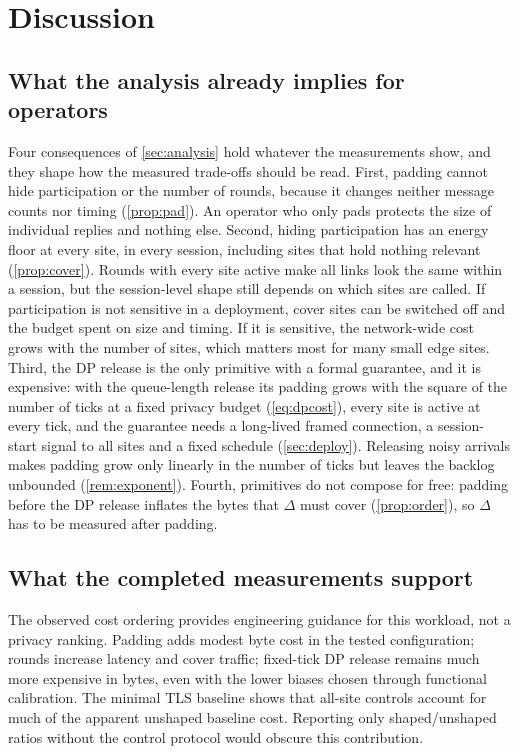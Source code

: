 \section{Discussion}\label{sec:discussion}

\subsection{What the analysis already implies for operators}
Four consequences of \cref{sec:analysis} hold whatever the measurements show, and they shape how the measured trade-offs should be read.
First, padding cannot hide participation or the number of rounds, because it changes neither message counts nor timing (\cref{prop:pad}). An operator who only pads protects the size of individual replies and nothing else.
Second, hiding participation has an energy floor at every site, in every session, including sites that hold nothing relevant (\cref{prop:cover}). Rounds with every site active make all links look the same within a session, but the session-level shape still depends on which sites are called. If participation is not sensitive in a deployment, cover sites can be switched off and the budget spent on size and timing. If it is sensitive, the network-wide cost grows with the number of sites, which matters most for many small edge sites.
Third, the DP release is the only primitive with a formal guarantee, and it is expensive: with the queue-length release its padding grows with the square of the number of ticks at a fixed privacy budget (\cref{eq:dpcost}), every site is active at every tick, and the guarantee needs a long-lived framed connection, a session-start signal to all sites and a fixed schedule (\cref{sec:deploy}). Releasing noisy arrivals makes padding grow only linearly in the number of ticks but leaves the backlog unbounded (\cref{rem:exponent}).
Fourth, primitives do not compose for free: padding before the DP release inflates the bytes that $\Delta$ must cover (\cref{prop:order}), so $\Delta$ has to be measured after padding.

\subsection{What the completed measurements support}
The observed cost ordering provides engineering guidance for this workload, not a privacy ranking. Padding adds modest byte cost in the tested configuration; rounds increase latency and cover traffic; fixed-tick DP release remains much more expensive in bytes, even with the lower biases chosen through functional calibration. The minimal TLS baseline shows that all-site controls account for much of the apparent unshaped baseline cost. Reporting only shaped/unshaped ratios without the control protocol would obscure this contribution.

